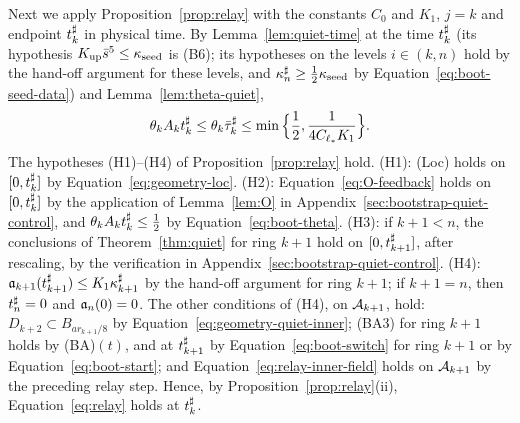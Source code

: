 Next we apply Proposition~\ref{prop:relay} with the constants $C_0$ and $K_1$,
$j=k$ and endpoint $t^\sharp_k$ in physical time. By
Lemma~\ref{lem:quiet-time} at the time $t^\sharp_k$ (its hypothesis
$K_{\mathrm{up}}\bar s^5\le\kappa_{\mathrm{seed}}$ is (B6); its hypotheses on the levels
$i\in(k,n)$ hold by the hand-off argument for these levels, and $\kappa^\sharp_n\ge\frac12\kappa_{\mathrm{seed}}$ by
Equation~\eqref{eq:boot-seed-data}) and Lemma~\ref{lem:theta-quiet},
\begin{equation}
\label{eq:boot-theta}
\theta_k A_kt^\sharp_k\le\theta_k\bar\tau^\sharp_k\le\min\Big\{\frac12,\frac1{4C_{\ell_*} K_1}\Big\}.
\end{equation}
The hypotheses (H1)--(H4) of Proposition~\ref{prop:relay} hold. (H1): (Loc) holds on
$[0,t^\sharp_k]$ by Equation~\eqref{eq:geometry-loc}. (H2):
Equation~\eqref{eq:O-feedback} holds on $[0,t^\sharp_k]$ by the application of
Lemma~\ref{lem:O} in Appendix~\ref{sec:bootstrap-quiet-control}, and $\theta_k A_kt^\sharp_k\le\frac12$ by
Equation~\eqref{eq:boot-theta}. (H3): if $k+1<n$, the
conclusions of Theorem~\ref{thm:quiet} for ring $k+1$ hold on
$[0,t^\sharp_{k+1}]$, after rescaling, by the verification in
Appendix~\ref{sec:bootstrap-quiet-control}.
(H4): $\mathfrak{a}_{k+1}(t^\sharp_{k+1})\le K_1\kappa^\sharp_{k+1}$ by
the hand-off argument for ring $k+1$; if $k+1=n$, then $t^\sharp_n=0$ and $\mathfrak{a}_n(0)=0$. The
other conditions of (H4), on $\mathcal{A}_{k+1}$, hold: $D_{k+2}\subset B_{ar_{k+1}/8}$ by Equation~\eqref{eq:geometry-quiet-inner};
(BA3) for ring $k+1$ holds by (BA)$(t)$, and at $t^\sharp_{k+1}$ by
Equation~\eqref{eq:boot-switch} for ring $k+1$ or by
Equation~\eqref{eq:boot-start}; and
Equation~\eqref{eq:relay-inner-field} holds on $\mathcal{A}_{k+1}$ by the
preceding relay step. Hence, by Proposition~\ref{prop:relay}(ii), Equation~\eqref{eq:relay}
holds at $t^\sharp_k$.

